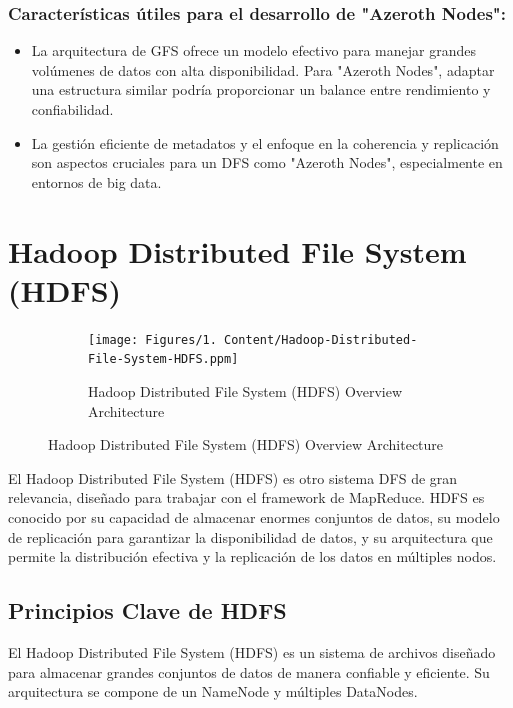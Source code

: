 \subsubsection{Características útiles para el desarrollo de "Azeroth Nodes":}

\begin{itemize}
    \item La arquitectura de GFS ofrece un modelo efectivo para manejar grandes volúmenes de datos con alta disponibilidad. Para "Azeroth Nodes", adaptar una estructura similar podría proporcionar un balance entre rendimiento y confiabilidad.
    \item La gestión eficiente de metadatos y el enfoque en la coherencia y replicación son aspectos cruciales para un DFS como "Azeroth Nodes", especialmente en entornos de big data.
\end{itemize}

\section{Hadoop Distributed File System (HDFS)}

\begin{figure}[H]
    \centering
    \begin{subfigure}[b]{0.5\textwidth}
        \centering
        \texttt{[image: Figures/1. Content/Hadoop-Distributed-File-System-HDFS.ppm]}
        \caption{Hadoop Distributed File System (HDFS) Overview Architecture}
        \label{fig: HDFSArchitecture}
    \end{subfigure}
    \hfill
\end{figure}

El Hadoop Distributed File System (HDFS) es otro sistema DFS de gran relevancia, diseñado para trabajar con el framework de MapReduce. HDFS es conocido por su capacidad de almacenar enormes conjuntos de datos, su modelo de replicación para garantizar la disponibilidad de datos, y su arquitectura que permite la distribución efectiva y la replicación de los datos en múltiples nodos.

\subsection{Principios Clave de HDFS}

El Hadoop Distributed File System (HDFS) es un sistema de archivos diseñado para almacenar grandes conjuntos de datos de manera confiable y eficiente. Su arquitectura se compone de un NameNode y múltiples DataNodes.

